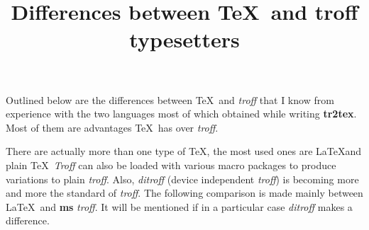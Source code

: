 
\def\troff{{\it troff}}
\def\Troff{{\it Troff}}
\def\ditroff{{\it ditroff}}
\def\Ditroff{{\it Ditroff}}

\title{Differences between \TeX\ and troff typesetters}

Outlined below are the differences between \TeX\ and \troff\/ that
I know from experience with the two languages most of which
obtained while writing {\bf tr2tex}.
Most of them are advantages \TeX\ has over \troff.

There are actually more than one type of \TeX, the most
used ones are \LaTeX and plain \TeX\
\Troff\/ can also be loaded with various macro packages to
produce variations to plain \troff. Also, \ditroff\/ (device independent \troff)
is becoming more and more the standard of \troff.
The following comparison is made mainly between \LaTeX\ and {\bf ms} \troff.
It will be mentioned if in a particular case \ditroff\/ makes a difference.

